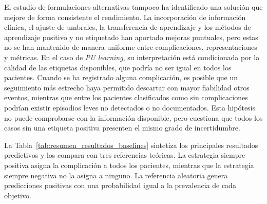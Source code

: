 El estudio de formulaciones alternativas tampoco ha identificado una solución que mejore de forma consistente el rendimiento. La incorporación de información clínica, el ajuste de umbrales, la transferencia de aprendizaje y los métodos de aprendizaje positivo y no etiquetado han aportado mejoras puntuales, pero estas no se han mantenido de manera uniforme entre complicaciones, representaciones y métricas. En el caso de \textit{PU learning}, su interpretación está condicionada por la calidad de las etiquetas disponibles, que podría no ser igual en todos los pacientes. Cuando se ha registrado alguna complicación, es posible que un seguimiento más estrecho haya permitido descartar con mayor fiabilidad otros eventos, mientras que entre los pacientes clasificados como sin complicaciones podrían existir episodios leves no detectados o no documentados. Esta hipótesis no puede comprobarse con la información disponible, pero cuestiona que todos los casos sin una etiqueta positiva presenten el mismo grado de incertidumbre.


La Tabla~\ref{tab:resumen_resultados_baselines} sintetiza los principales resultados predictivos y los compara con tres referencias teóricas. La estrategia siempre positiva asigna la complicación a todos los pacientes, mientras que la estrategia siempre negativa no la asigna a ninguno. La referencia aleatoria genera predicciones positivas con una probabilidad igual a la prevalencia de cada objetivo. 

